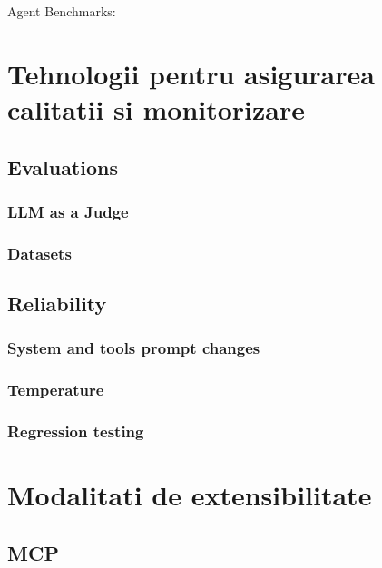  Agent Benchmarks:
  \cite{liSafeGenBenchBenchmarkFramework2025}
  \cite{agasheEvaluatingMultiAgentCoordination2023}
  \cite{wangOpenHandsOpenPlatform2025}
  \cite{liuAgentBenchEvaluatingLLMs2025}
  \cite{dengSWEBenchProCan2025}
  \cite{jimenezSWEbenchCanLanguage2024}
  \cite{ganMASTERMultiAgentSystem2025}
  \cite{hendrycksMeasuringCodingChallenge2021}
  \cite{wangSurveyAgentOpsCategorization2025}
  \cite{liuRepoQAEvaluatingLong2024}
  \cite{merrillTerminalBenchBenchmarkingAgents2026}


  \section{Tehnologii pentru asigurarea calitatii si monitorizare}
    \subsection{Evaluations}
      \subsubsection{LLM as a Judge}
      \subsubsection{Datasets}
    \subsection{Reliability}
      \subsubsection{System and tools prompt changes}
      \subsubsection{Temperature}
      \subsubsection{Regression testing}

  \section{Modalitati de extensibilitate}
    \subsection{MCP}